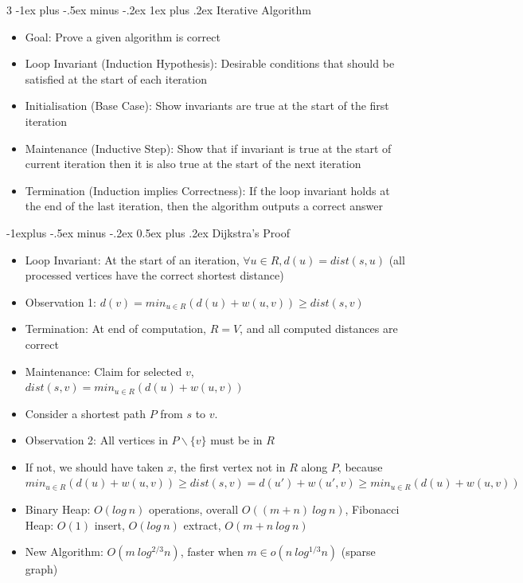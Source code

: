 \documentclass[10pt, landscape]{article}
\makeatletter
\renewcommand{\section}{\@startsection{section}{1}{0mm}%
                                {-1ex plus -.5ex minus -.2ex}%
                                {0.5ex plus .2ex}%
                                {\normalfont\large\bfseries}}
\renewcommand{\section}{\@startsection{section}{2}{0mm}%
                                {-1explus -.5ex minus -.2ex}%
                                {0.5ex plus .2ex}%
                                {\normalfont\normalsize\bfseries}}
\renewcommand{\subsection}{\@startsection{subsection}{3}{0mm}%
                                {-1ex plus -.5ex minus -.2ex}%
                                {1ex plus .2ex}%
                                {\normalfont\small\bfseries}}%
\makeatother
\begin{document}
\begin{multicols*}{3}
\subsection{Iterative Algorithm}
\begin{itemize}
    \item Goal: Prove a given algorithm is correct
    \item Loop Invariant (Induction Hypothesis): Desirable conditions that should be satisfied at the start of each iteration
    \item Initialisation (Base Case): Show invariants are true at the start of the first iteration
    \item Maintenance (Inductive Step): Show that if invariant is true at the start of current iteration then it is also true at the start of the next iteration
    \item Termination (Induction implies Correctness): If the loop invariant holds at the end of the last iteration, then the algorithm outputs a correct answer
\end{itemize}

\section{Dijkstra's Proof}
\begin{itemize}
    \item Loop Invariant: At the start of an iteration, $\forall u \in R, d(u)=dist(s,u)$ (all processed vertices have the correct shortest distance)
    \item Observation 1: $d(v)=min_{u \in R}(d(u)+w(u,v)) \geq dist(s,v)$
    \item Termination: At end of computation, $R=V$, and all computed distances are correct
    \item Maintenance: Claim for selected $v$, $dist(s,v)=min_{u \in R}(d(u)+w(u,v))$
    \item Consider a shortest path $P$ from $s$ to $v$.
    \item Observation 2: All vertices in $P \backslash \{v\}$ must be in $R$
    \item If not, we should have taken $x$, the first vertex not in $R$ along $P$, because $min_{u \in R}(d(u)+w(u,v)) \geq dist(s, v)=d(u')+w(u',v) \geq min_{u \in R}(d(u)+w(u,v))$
    \item Binary Heap: $O(log\ n)$ operations, overall $O((m+n)\ log\ n)$, Fibonacci Heap: $O(1)$ insert, $O(log\ n)$ extract, $O(m+n\ log\ n)$
    \item New Algorithm: $O(m\ log^{2/3}n)$, faster when $m \in o(n\ log^{1/3}n)$ (sparse graph)
\end{itemize}


\end{multicols*}
\end{document}
